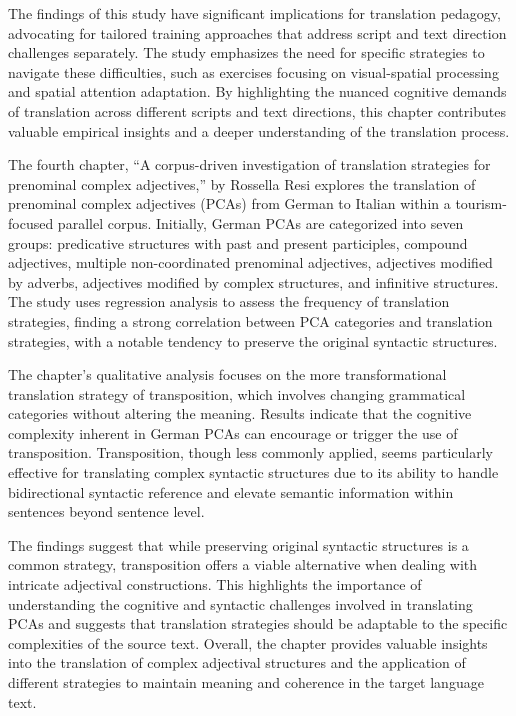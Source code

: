 \documentclass[output=paper]{langscibook}
\begin{document}
The findings of this study have significant implications for translation pedagogy, advocating for tailored training approaches that address script and text direction challenges separately. The study emphasizes the need for specific strategies to navigate these difficulties, such as exercises focusing on visual-spatial processing and spatial attention adaptation. By highlighting the nuanced cognitive demands of translation across different scripts and text directions, this chapter contributes valuable empirical insights and a deeper understanding of the translation process.

The fourth chapter, “A corpus-driven investigation of translation strategies for prenominal complex adjectives,” by Rossella Resi explores the translation of prenominal complex adjectives (PCAs) from German to Italian within a tourism-focused parallel corpus. Initially, German PCAs are categorized into seven groups: predicative structures with past and present participles, compound adjectives, multiple non-coordinated prenominal adjectives, adjectives modified by adverbs, adjectives modified by complex structures, and infinitive structures. The study uses regression analysis to assess the frequency of translation strategies, finding a strong correlation between PCA categories and translation strategies, with a notable tendency to preserve the original syntactic structures.

The chapter’s qualitative analysis focuses on the more transformational translation strategy of transposition, which involves changing grammatical categories without altering the meaning. Results indicate that the cognitive complexity inherent in German PCAs can encourage or trigger the use of transposition. Transposition, though less commonly applied, seems particularly effective for translating complex syntactic structures due to its ability to handle bidirectional syntactic reference and elevate semantic information within sentences beyond sentence level.

The findings suggest that while preserving original syntactic structures is a common strategy, transposition offers a viable alternative when dealing with intricate adjectival constructions. This highlights the importance of understanding the cognitive and syntactic challenges involved in translating PCAs and suggests that translation strategies should be adaptable to the specific complexities of the source text. Overall, the chapter provides valuable insights into the translation of complex adjectival structures and the application of different strategies to maintain meaning and coherence in the target language text.
\end{document}
